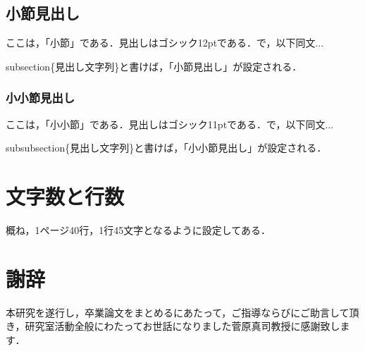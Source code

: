 \documentclass[11pt]{icsthesis}
\begin{document}
\subsection{小節見出し}
ここは，「小節」である．見出しはゴシック12ptである．で，以下同文...

\textsf{\yen subsection\{見出し文字列\}}と書けば，「小節見出し」が設定される．

\subsubsection{小小節見出し}
ここは，「小小節」である．見出しはゴシック11ptである．で，以下同文...

\textsf{\yen subsubsection\{見出し文字列\}}と書けば，「小小節見出し」が設定される．

\section{文字数と行数}
概ね，1ページ40行，1行45文字となるように設定してある．



\clearpage
\fancyhead[L]{}\fancyhead[R]{}
\renewcommand{\headrulewidth}{0truemm}
\section*{謝辞}
本研究を遂行し，卒業論文をまとめるにあたって，ご指導ならびにご助言して頂き，研究室活動全般にわたってお世話になりました菅原真司教授に感謝致します．

\clearpage

\fancyhead[L]{\nouppercase{\small\leftmark}}\fancyhead[R]{}
\renewcommand{\headrulewidth}{0.3truemm}


\clearpage
\fancyhead[L]{\nouppercase{\small\leftmark}}
\fancyhead[R]{\nouppercase{\small\rightmark}}
\fancyfoot[C]{--\ \thepage\ --}
\renewcommand{\headrulewidth}{0.3truemm}
\appendix
\end{document}
